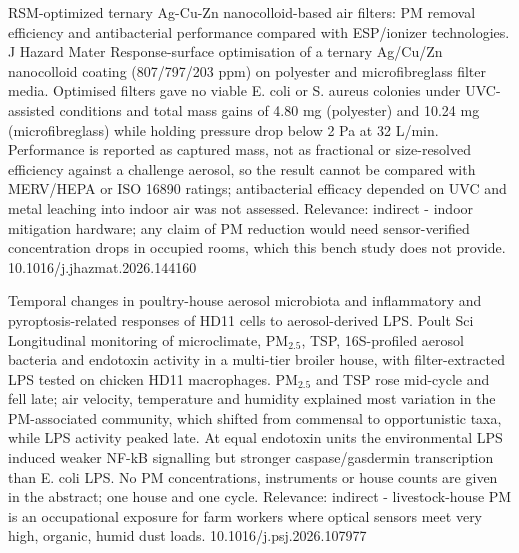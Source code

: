 \documentclass[10pt]{article}
\begin{document}
{RSM-optimized ternary Ag-Cu-Zn nanocolloid-based air filters: PM removal efficiency and antibacterial performance compared with ESP/ionizer technologies.}
{J Hazard Mater}
{Response-surface optimisation of a ternary Ag/Cu/Zn nanocolloid coating (807/797/203 ppm) on polyester and microfibreglass filter media. Optimised filters gave no viable E. coli or S. aureus colonies under UVC-assisted conditions and total mass gains of 4.80 mg (polyester) and 10.24 mg (microfibreglass) while holding pressure drop below 2 Pa at 32 L/min. Performance is reported as captured mass, not as fractional or size-resolved efficiency against a challenge aerosol, so the result cannot be compared with MERV/HEPA or ISO 16890 ratings; antibacterial efficacy depended on UVC and metal leaching into indoor air was not assessed. Relevance: indirect - indoor mitigation hardware; any claim of PM reduction would need sensor-verified concentration drops in occupied rooms, which this bench study does not provide.}
{10.1016/j.jhazmat.2026.144160}

{Temporal changes in poultry-house aerosol microbiota and inflammatory and pyroptosis-related responses of HD11 cells to aerosol-derived LPS.}
{Poult Sci}
{Longitudinal monitoring of microclimate, PM$_{2.5}$, TSP, 16S-profiled aerosol bacteria and endotoxin activity in a multi-tier broiler house, with filter-extracted LPS tested on chicken HD11 macrophages. PM$_{2.5}$ and TSP rose mid-cycle and fell late; air velocity, temperature and humidity explained most variation in the PM-associated community, which shifted from commensal to opportunistic taxa, while LPS activity peaked late. At equal endotoxin units the environmental LPS induced weaker NF-kB signalling but stronger caspase/gasdermin transcription than E. coli LPS. No PM concentrations, instruments or house counts are given in the abstract; one house and one cycle. Relevance: indirect - livestock-house PM is an occupational exposure for farm workers where optical sensors meet very high, organic, humid dust loads.}
{10.1016/j.psj.2026.107977}
\end{document}
